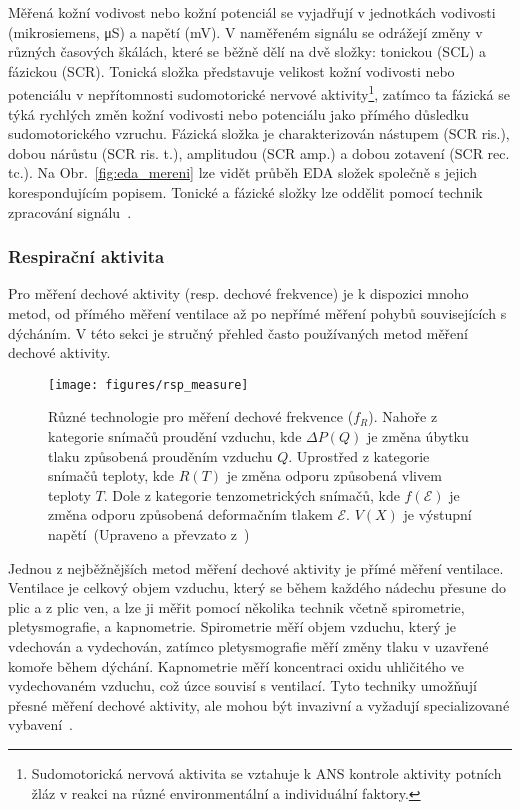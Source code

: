 Měřená kožní vodivost nebo kožní potenciál se vyjadřují v jednotkách vodivosti
(mikrosiemens, \si{\micro\siemens}) a napětí (\si{\milli\volt}). V naměřeném
signálu se odrážejí změny v různých časových škálách, které se běžně dělí na dvě
složky: tonickou (\gls{SCL}) a fázickou (\gls{SCR}). Tonická složka představuje
velikost kožní vodivosti nebo potenciálu v nepřítomnosti sudomotorické nervové
aktivity\footnote{Sudomotorická nervová aktivita se vztahuje k \gls{ANS}
    kontrole aktivity potních žláz v reakci na různé environmentální a individuální
    faktory.}, zatímco ta fázická se týká rychlých změn kožní vodivosti nebo
potenciálu jako přímého důsledku sudomotorického vzruchu. Fázická složka je
charakterizován nástupem (SCR ris.), dobou nárůstu (SCR ris. t.), amplitudou
(SCR amp.) a dobou zotavení (SCR rec. tc.). Na Obr.~\ref{fig:eda_mereni} lze
vidět průběh EDA složek společně s jejich korespondujícím popisem. Tonické a
fázické složky lze oddělit pomocí technik zpracování
signálu~\cite{Boucsein2012,Li2022,Posada2020,Caruelle2019,Caruelle2019}.

\subsubsection{Respirační aktivita}
\label{subsec:respiracni_aktivita}
Pro měření dechové aktivity (resp. dechové frekvence) je k dispozici mnoho
metod, od přímého měření ventilace až po nepřímé měření pohybů souvisejících s
dýcháním. V této sekci je stručný přehled často používaných metod měření dechové
aktivity.

\begin{figure}[htb!]
    \begin{center}
        \texttt{[image: figures/rsp\_measure]}
        \caption{Různé technologie pro měření dechové frekvence ($f_R$). Nahoře
        z kategorie snímačů proudění vzduchu, kde $ΔP(Q)$ je změna úbytku tlaku
        způsobená prouděním vzduchu $Q$. Uprostřed z kategorie snímačů teploty,
        kde $R(T)$ je změna odporu způsobená vlivem teploty $T$. Dole z
        kategorie tenzometrických snímačů, kde $f(\mathcal{E})$ je změna odporu
        způsobená deformačním tlakem $\mathcal{E}$. $V(X)$ je výstupní
        napětí~(Upraveno a převzato z~\cite{Massaroni2019})}
        \label{fig:rsp_mereni}
    \end{center}
\end{figure}

Jednou z nejběžnějších metod měření dechové aktivity je přímé měření ventilace.
Ventilace je celkový objem vzduchu, který se během každého nádechu přesune do
plic a z plic ven, a lze ji měřit pomocí několika technik včetně spirometrie,
pletysmografie, a kapnometrie. Spirometrie měří objem vzduchu, který je
vdechován a vydechován, zatímco pletysmografie měří změny tlaku v uzavřené
komoře během dýchání. Kapnometrie měří koncentraci oxidu uhličitého ve
vydechovaném vzduchu, což úzce souvisí s ventilací. Tyto techniky umožňují
přesné měření dechové aktivity, ale mohou být invazivní a vyžadují
specializované vybavení~\cite{Massaroni2019,Massaroni2021,Liu2019}. 

